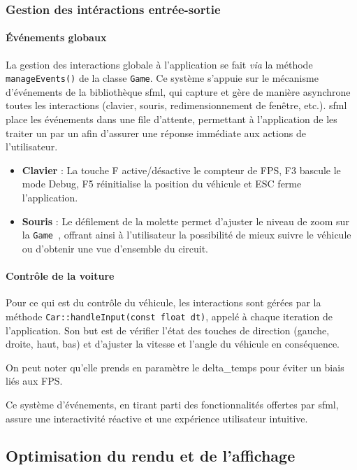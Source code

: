 \subsubsection{Gestion des intéractions entrée-sortie}\label{subsubsec:gestion-des-interactions-entree-sortie}
\paragraph{Événements globaux}
La gestion des interactions globale à l'application se fait \textit{via} la méthode \texttt{manageEvents()} de la classe \texttt{Game}.
Ce système s'appuie sur le mécanisme d'événements de la bibliothèque \gls{sfml}, qui capture et gère de manière asynchrone toutes les interactions (clavier, souris, redimensionnement de fenêtre, etc.).
\gls{sfml} place les événements dans une file d'attente, permettant à l'application de les traiter un par un afin d'assurer une réponse immédiate aux actions de l'utilisateur.

\begin{itemize}
    \item \textbf{Clavier} : La touche F active/désactive le compteur de FPS, F3 bascule le mode Debug, F5 réinitialise la position du véhicule et ESC ferme l'application.
    \item \textbf{Souris} : Le défilement de la molette permet d'ajuster le niveau de zoom sur la \texttt{Game }, offrant ainsi à l'utilisateur la possibilité de mieux suivre le véhicule ou d'obtenir une vue d'ensemble du circuit.
\end{itemize}

\paragraph{Contrôle de la voiture}
Pour ce qui est du contrôle du véhicule, les interactions sont gérées par la méthode \texttt{Car::handleInput(const float dt)}, appelé à chaque iteration de l'application.
Son but est de vérifier l'état des touches de direction (gauche, droite, haut, bas) et d'ajuster la vitesse et l'angle du véhicule en conséquence.

On peut noter qu'elle prends en paramètre le \gls{delta_temps} pour éviter un biais liés aux \gls{FPS}.

Ce système d'événements, en tirant parti des fonctionnalités offertes par \gls{sfml}, assure une interactivité réactive et une expérience utilisateur intuitive.

\subsection{Optimisation du rendu et de l'affichage}\label{subsec:optimisation-du-rendu-et-de-l-affichage}

